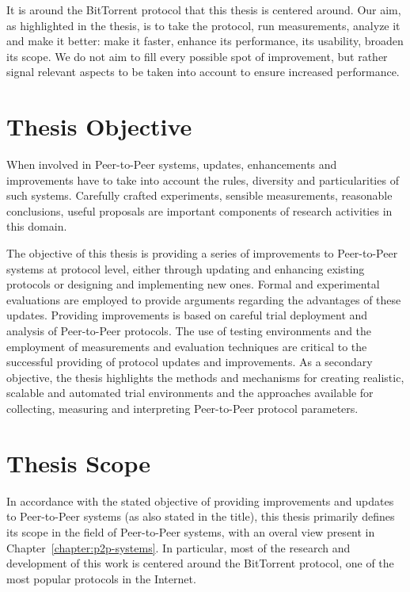 It is around the BitTorrent protocol that this thesis is centered around. Our
aim, as highlighted in the thesis, is to take the protocol, run measurements,
analyze it and make it better: make it faster, enhance its performance, its
usability, broaden its scope. We do not aim to fill every possible spot of
improvement, but rather signal relevant aspects to be taken into account to
ensure increased performance.

\section{Thesis Objective}
\label{sec:intro:objective}

When involved in Peer-to-Peer systems, updates, enhancements and improvements
have to take into account the rules, diversity and particularities of such
systems. Carefully crafted experiments, sensible measurements, reasonable
conclusions, useful proposals are important components of research activities
in this domain.

The objective of this thesis is providing a series of improvements to
Peer-to-Peer systems at protocol level, either through updating and enhancing
existing protocols or designing and implementing new ones. Formal and
experimental evaluations are employed to provide arguments regarding the
advantages of these updates. Providing improvements is based on careful
trial deployment and analysis of Peer-to-Peer protocols. The use of testing
environments and the employment of measurements and evaluation techniques are
critical to the successful providing of protocol updates and improvements. As
a secondary objective, the thesis highlights the methods and mechanisms for
creating realistic, scalable and automated trial environments and the
approaches available for collecting, measuring and interpreting Peer-to-Peer
protocol parameters.

\section{Thesis Scope}
\label{sec:intro:scope}

In accordance with the stated objective of providing improvements and updates
to Peer-to-Peer systems (as also stated in the title), this thesis primarily
defines its scope in the field of Peer-to-Peer systems, with an overal view
present in Chapter~\ref{chapter:p2p-systems}. In particular, most of
the research and development of this work is centered around the BitTorrent
protocol, one of the most popular protocols in the Internet.

